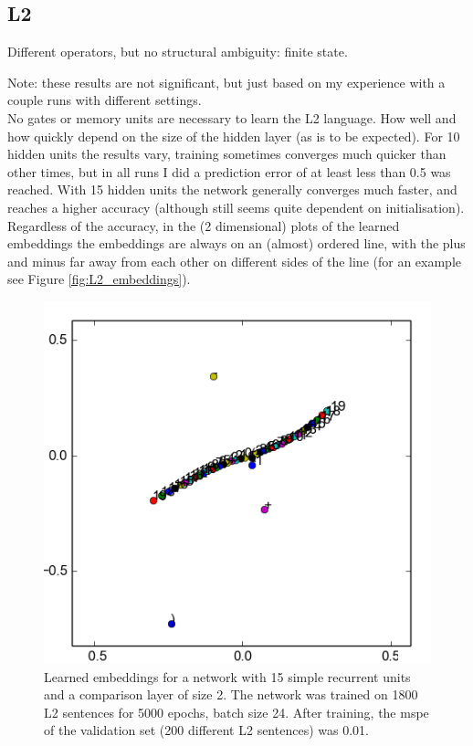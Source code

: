 \documentclass{article}
\begin{document}
\subsection{L2}

Different operators, but no structural ambiguity: finite state.

Note: these results are not significant, but just based on my experience with a couple runs with different settings.\\

No gates or memory units are necessary to learn the L2 language. 
How well and how quickly depend on the size of the hidden layer (as is to be expected).
For 10 hidden units the results vary, training sometimes converges much quicker than other times, but in all runs I did a prediction error of at least less than 0.5 was reached.
With 15 hidden units the network generally converges much faster, and reaches a higher accuracy (although still seems quite dependent on initialisation).\\

Regardless of the accuracy, in the (2 dimensional) plots of the learned embeddings the embeddings are always on an (almost) ordered line, with the plus and minus far away from each other on different sides of the line (for an example see Figure \ref{fig:L2_embeddings}).

\begin{figure}[!ht]
    \includegraphics{L2_embeddings.png}
    \caption{Learned embeddings for a network with 15 simple recurrent units and a comparison layer of size 2. The network was trained on 1800 L2 sentences for 5000 epochs, batch size 24. After training, the mspe of the validation set (200 different L2 sentences) was 0.01.}
\end{figure}
\end{document}
